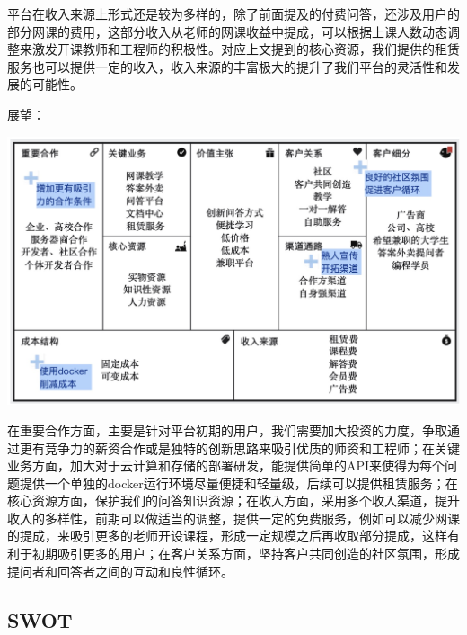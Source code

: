 \documentclass[a4paper]{ctexart}
\begin{document}
平台在收入来源上形式还是较为多样的，除了前面提及的付费问答，还涉及用户的部分网课的费用，这部分收入从老师的网课收益中提成，可以根据上课人数动态调整来激发开课教师和工程师的积极性。对应上文提到的核心资源，我们提供的租赁服务也可以提供一定的收入，收入来源的丰富极大的提升了我们平台的灵活性和发展的可能性。

展望：
\begin{center}
  \includegraphics[scale=0.3]{展望.png}
\end{center}
在重要合作方面，主要是针对平台初期的用户，我们需要加大投资的力度，争取通过更有竞争力的薪资合作或是独特的创新思路来吸引优质的师资和工程师；在关键业务方面，加大对于云计算和存储的部署研发，能提供简单的API来使得为每个问题提供一个单独的docker运行环境尽量便捷和轻量级，后续可以提供租赁服务；在核心资源方面，保护我们的问答知识资源；在收入方面，采用多个收入渠道，提升收入的多样性，前期可以做适当的调整，提供一定的免费服务，例如可以减少网课的提成，来吸引更多的老师开设课程，形成一定规模之后再收取部分提成，这样有利于初期吸引更多的用户；在客户关系方面，坚持客户共同创造的社区氛围，形成提问者和回答者之间的互动和良性循环。

\subsection{SWOT}
\end{document}
